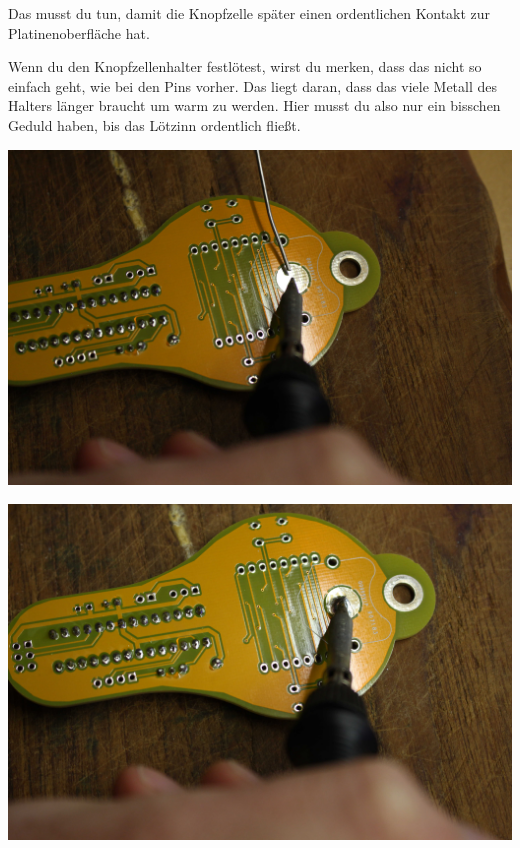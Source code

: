 \documentclass{article}
\begin{document}
Das musst du tun, damit die Knopfzelle später einen ordentlichen Kontakt zur Platinenoberfläche hat.

Wenn du den Knopfzellenhalter festlötest, wirst du merken, dass das nicht so einfach geht, wie bei den Pins vorher. Das liegt daran, dass das viele Metall des Halters länger braucht um warm zu werden. Hier musst du also nur ein bisschen Geduld haben, bis das Lötzinn ordentlich fließt.

\vspace{1cm}

\begin{minipage}[b]{0.5\textwidth}
	\includegraphics[width=\textwidth]{Bilder/IMG_5561.JPG}
\end{minipage}
\begin{minipage}[b]{0.5\textwidth}
	\includegraphics[width=\textwidth]{Bilder/IMG_5562.JPG}
\end{minipage}
\end{document}
